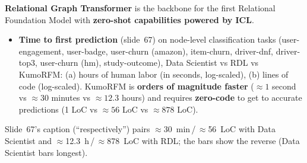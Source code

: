 \begin{keyidea}
  \textbf{Relational Graph Transformer} is the backbone for the first Relational
  Foundation Model with \textbf{zero-shot capabilities powered by ICL}.
\end{keyidea}
\begin{itemize}
  \item \textbf{Time to first prediction} (slide~67) on node-level classification tasks
    (user-engagement, user-badge, user-churn (amazon), item-churn, driver-dnf,
    driver-top3, user-churn (hm), study-outcome), Data Scientist vs RDL vs KumoRFM:
    (a) hours of human labor (in seconds, log-scaled), (b) lines of code (log-scaled).
    KumoRFM is \textbf{orders of magnitude faster} ($\approx1$ second vs $\approx30$
    minutes vs $\approx12.3$ hours) and requires \textbf{zero-code} to get to accurate
    predictions (1 LoC vs $\approx56$ LoC vs $\approx878$ LoC).
\end{itemize}
\begin{caution}
  Slide~67's caption (``respectively'') pairs $\approx$30~min\,/\,$\approx$56~LoC with Data
  Scientist and $\approx$12.3~h\,/\,$\approx$878~LoC with RDL; the bars show the reverse
  (Data Scientist bars longest).
\end{caution}

